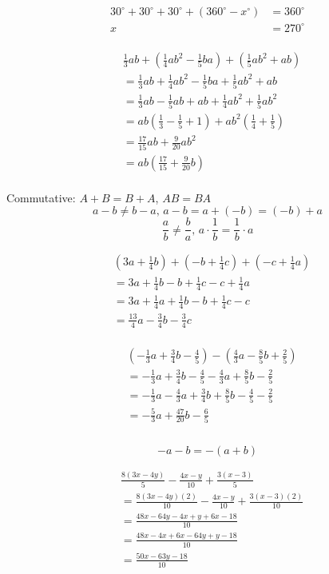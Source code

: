 \documentclass[]{article}
\begin{document}
\[\begin{aligned}
	30^\circ+30^\circ+30^\circ+(360^\circ-x^\circ)&=360^\circ\\
	x&=\boxed{270^\circ}
\end{aligned}\]
\\
\[\begin{aligned}
    &\frac13ab+\left(\frac14ab^2-\frac15ba\right)+\left(\frac15ab^2+ab\right)\\
    &=\frac13ab+\frac14ab^2-\frac15ba+\frac15ab^2+ab\\
    &=\frac13ab-\frac15ab+ab+\frac14ab^2+\frac15ab^2\\
    &=ab\left(\frac13-\frac15+1\right)+ab^2\left(\frac14+\frac15\right)\\
    &=\frac{17}{15}ab+\frac9{20}ab^2\\
    &=ab\left(\frac{17}{15}+\frac9{20}b\right)\\
\end{aligned}\]

Commutative: \(A+B=B+A\), \(AB=BA\)
\[a-b\ne b-a,\,a-b=a+(-b)=(-b)+a\]
\[\frac ab\ne \frac ba,\,a\cdot\frac1b=\frac1b\cdot a\]

\newpage

\[\begin{aligned}
    &\left(3a+\frac14b\right)+\left(-b+\frac14c\right)+\left(-c+\frac14a\right)\\
    &=3a+\frac14b-b+\frac14c-c+\frac14a\\
    &=3a+\frac14a+\frac14b-b+\frac14c-c\\
    &=\frac{13}4a-\frac34b-\frac34c
\end{aligned}\]
\\
\[\begin{aligned}
    &\left(-\frac13a+\frac34b-\frac45\right)-\left(\frac43a-\frac85b+\frac25\right)\\
    &=-\frac13a+\frac34b-\frac45-\frac43a+\frac85b-\frac25\\
    &=-\frac13a-\frac43a+\frac34b+\frac85b-\frac45-\frac25\\
    &=-\frac53a+\frac{47}{20}b-\frac65\\
\end{aligned}\]
\\
\[-a-b=-(a+b)\]

\[\begin{aligned}
    &\frac{8(3x-4y)}5-\frac{4x-y}{10}+\frac{3(x-3)}5\\
    &=\frac{8(3x-4y)(2)}{10}-\frac{4x-y}{10}+\frac{3(x-3)(2)}{10}\\
    &=\frac{48x-64y-4x+y+6x-18}{10}\\
    &=\frac{48x-4x+6x-64y+y-18}{10}\\
    &=\frac{50x-63y-18}{10}
\end{aligned}\]
\end{document}
